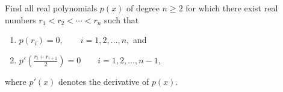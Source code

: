 Find all real polynomials $p(x)$ of degree $n \geq 2$ for which there
exist real numbers $r_1 < r_2 < \cdots < r_n$ such that
\begin{enumerate}
    \item $p(r_i) = 0, \qquad i = 1, 2, \dots, n,$ and
    \item $p' \left( \frac{r_i + r_{i+1}}{2} \right) = 0 \qquad i = 1, 2,
    \dots, n-1,$
\end{enumerate}
where $p'(x)$ denotes the derivative of $p(x)$.
